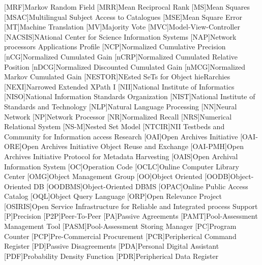 [MRF]{Markov Random Field}
[MRR]{Mean Reciprocal Rank}
[MS]{Mean Squares}
[MSAC]{Multilingual Subject Access to Catalogues}
[MSE]{Mean Square Error}
[MT]{Machine Translation}
[MV]{Majority Vote}
[MVC]{Model-View-Controller}
[NACSIS]{NAtional Center for Science Information Systems}
[NAP]{Network processors Applications Profile}
[NCP]{Normalized Cumulative Precision}
[nCG]{Normalized Cumulated Gain}
[nCRP]{Normalized Cumulated Relative Position}
[nDCG]{Normalized Discounted Cumulated Gain}
[nMCG]{Normalized Markov Cumulated Gain}
[NESTOR]{NEsted SeTs for Object hieRarchies}
[NEXI]{Narrowed Extended XPath I}
[NII]{National Institute of Informatics}
[NISO]{National Information Standards Organization}
[NIST]{National Institute of Standards and Technology}
[NLP]{Natural Language Processing}
[NN]{Neural Network}
[NP]{Network Processor}
[NR]{Normalized Recall}
[NRS]{Numerical Relational System}
[NS-M]{Nested Set Model}
[NTCIR]{NII Testbeds and Community for Information access Research}
[OAI]{Open Archives Initiative}
[OAI-ORE]{Open Archives Initiative Object Reuse and Exchange}
[OAI-PMH]{Open Archives Initiative Protocol for Metadata Harvesting}
[OAIS]{Open Archival Information System}
[OC]{Operation Code}
[OCLC]{Online Computer Library Center}
[OMG]{Object Management Group}
[OO]{Object Oriented}
[OODB]{Object-Oriented \acs{DB}}
[OODBMS]{Object-Oriented \acs{DBMS}}
[OPAC]{Online Public Access Catalog}
[OQL]{Object Query Language}
[ORP]{Open Relevance Project}
[OSIRIS]{Open Service Infrastructure for Reliable and Integrated process Support}
[P]{Precision}
[P2P]{Peer-To-Peer}
[PA]{Passive Agreements}
[PAMT]{Pool-Assessment Management Tool}
[PASM]{Pool-Assessment Storing Manager}
[PC]{Program Counter}
[PCP]{Pre-Commercial Procurement}
[PCR]{Peripherical Command Register}
[PD]{Passive Disagreements}
[PDA]{Personal Digital Assistant}
[PDF]{Probability Density Function}
[PDR]{Peripherical Data Register}

